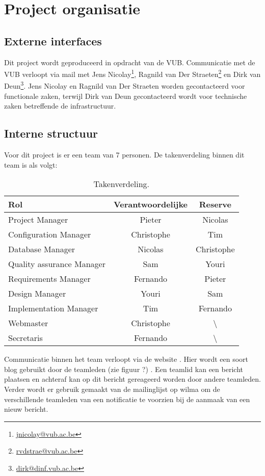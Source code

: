 \chapter{Project organisatie} \label{chap:ProjectOrganisatie}
\section{Externe interfaces}
Dit project wordt geproduceerd in opdracht van de VUB. Communicatie met de VUB verloopt via mail met Jens Nicolay\footnote{\href{mailto:jnicolay@vub.ac.be}{jnicolay@vub.ac.be}}, Ragnild van Der Straeten\footnote{\href{mailto:rvdstrae@vub.ac.be}{rvdstrae@vub.ac.be}} en Dirk van Deun\footnote{\href{mailto:dirk@dinf.vub.ac.be}{dirk@dinf.vub.ac.be}}. Jens Nicolay en Ragnild van Der Straeten worden gecontacteerd voor functionale zaken, terwijl Dirk van Deun gecontacteerd wordt voor technische zaken betreffende de infrastructuur.

\section{Interne structuur}
Voor dit project is er een team van 7 personen. De takenverdeling binnen dit team is als volgt:
\begin{table} [H]
	\centering
	\caption{Takenverdeling.}
	\begin{tabular} {l|cc}
		Rol & Verantwoordelijke & Reserve \\
		\hline
		Project Manager & Pieter & Nicolas \\
		Configuration Manager & Christophe & Tim \\
		Database Manager & Nicolas & Christophe \\
		Quality assurance Manager & Sam & Youri \\
		Requirements Manager & Fernando & Pieter \\
		Design Manager & Youri & Sam \\
		Implementation Manager & Tim & Fernando \\
		\hline
		Webmaster & Christophe & \textbackslash \\
		Secretaris & Fernando & \textbackslash 
	\end{tabular}
	\label{tab:takenverdeling}
\end{table}

Communicatie binnen het team verloopt via de website \cite{portalWebsite}. Hier wordt een soort blog gebruikt door de teamleden (zie figuur ?) . Een teamlid kan een bericht plaatsen en achteraf kan op dit bericht gereageerd worden door andere teamleden. Verder wordt er gebruik gemaakt van de mailinglijst op wilma om de verschillende teamleden van een notificatie te voorzien bij de aanmaak van een nieuw bericht. 

